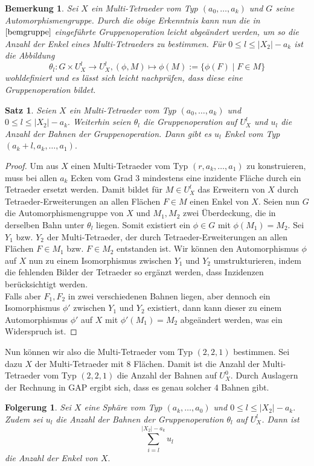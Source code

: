 \documentclass[12pt,titlepage,twoside,cleardoublepage]{article}
\theoremstyle{nummermitklammern}
\newtheorem{folgerung}[temp]{Folgerung}
\newtheorem{bemerkung}[temp]{Bemerkung}
\newtheorem{satz}[temp]{Satz}
\newtheorem{folgerung}[zahl]{Folgerung}
\newtheorem{bemerkung}[zahl]{Bemerkung}
\newtheorem{satz}[zahl]{Satz}
\numberwithin{equation}{section}
\begin{document}
\begin{bemerkung}
Sei $X$ ein Multi-Tetraeder vom Typ $(a_0,\ldots ,a_k)$ und $G$ seine Automorphismengruppe.
Durch die obige Erkenntnis kann nun die in $\Cref{bemgruppe}$ eingeführte Gruppenoperation leicht abgeändert werden, um so die Anzahl der Enkel eines Multi-Tetraeders zu bestimmen. Für $0\leq l\leq \vert X_2 \vert -a_k$ ist die Abbildung
\[
\theta_l: G\times U_X^l \to U_X^l, (\phi, M)\mapsto \phi(M):=\{\phi(F)\mid F\in M\}
\] 
wohldefiniert und es lässt sich leicht nachprüfen, dass diese eine Gruppenoperation bildet.
\end{bemerkung}
\begin{satz}
Seien $X$ ein Multi-Tetraeder vom Typ $(a_0,\ldots,a_k)$ und $0\leq l\leq \vert X_2\vert -a_k.$ Weiterhin seien $\theta_l$ die Gruppenoperation auf $U_X^l$ und $u_l$ die Anzahl der Bahnen der Gruppenoperation. Dann gibt es $u_l$ Enkel vom Typ $(a_k+l,a_k,\ldots,a_1).$
\end{satz}
\begin{proof}
Um aus $X$ einen Multi-Tetraeder vom Typ $(r,a_k,\ldots,a_1)$ zu konstruieren, muss bei allen $a_k$ Ecken vom Grad 3 mindestens eine inzidente Fläche durch ein Tetraeder ersetzt werden. Damit bildet für $M\in U_X^l$ das Erweitern von $X$ durch Tetraeder-Erweiterungen an allen Flächen $F\in M$ einen Enkel von $X$. Seien nun $G$ die Automorphismengruppe von $X$ und $M_1,M_2$ zwei Überdeckung, die in derselben Bahn unter $\theta_l$ liegen. Somit existiert ein $\phi \in G$ mit $\phi(M_1)=M_2.$ Sei $Y_1$ bzw. $Y_2$ der Multi-Tetraeder, der durch Tetraeder-Erweiterungen an allen Flächen $F\in M_1$ bzw. $F \in M_2$ entstanden ist. Wir können den Automorphismus $\phi$ auf $X$ nun zu einem Isomorphismus zwischen $Y_1$ und $Y_2$ umstrukturieren, indem die fehlenden Bilder der Tetraeder so ergänzt werden, dass Inzidenzen berücksichtigt werden. \\
Falls aber $F_1,F_2$ in zwei verschiedenen Bahnen liegen, aber dennoch ein Isomorphismus $\phi'$ zwischen $Y_1$ und $Y_2$ existiert, dann kann dieser zu einem Automorphismus $\phi'$ auf $X$ mit $\phi'(M_1)=M_2$ abgeändert werden, was ein Widerspruch ist.
\end{proof}
Nun können wir also die Multi-Tetraeder vom Typ $(2,2,1)$ bestimmen. Sei dazu $X$ der Multi-Tetraeder mit 8 Flächen.
Damit ist die Anzahl der Multi-Tetraeder vom Typ $(2,2,1)$ die Anzahl der Bahnen auf $U^0_X.$ Durch Auslagern der Rechnung in GAP ergibt sich, dass es genau solcher 4 Bahnen gibt.
\begin{folgerung}
Sei $X$ eine Sphäre vom Typ $(a_k,\ldots, a_0)$ und $0\leq l\leq \vert X_2\vert -a_k.$ Zudem sei $u_l$ die Anzahl der Bahnen der Gruppenoperation $\theta_l$ auf $U_X^l$. Dann ist 
\[
\sum_{i=l}^{\vert X_2\vert -a_k} u_l
\] die Anzahl der Enkel von $X.$
\end{folgerung}
\end{document}
